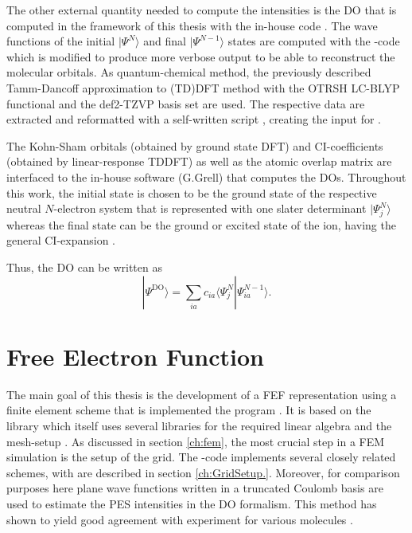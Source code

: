 The other external quantity needed to compute the intensities is the DO that is computed in the framework of this thesis with the in-house code  \cite{MAgg}.
The wave functions of the initial $|\Psi^N\rangle$ and final $|\Psi^{N-1}\rangle$ states are computed with the -code which is modified to produce more verbose output to be able to reconstruct the molecular orbitals.
As quantum-chemical method, the previously described Tamm-Dancoff approximation to (TD)DFT method with the OTRSH LC-BLYP \cite{lcBLYP} functional and the def2-TZVP \cite{def2tzvp} basis set are used.
The respective data are extracted and reformatted with a self-written script \cite{nwc2dy}, creating the input for .

The Kohn-Sham orbitals (obtained by ground state DFT) and CI-coefficients (obtained by linear-response TDDFT) as well as the atomic overlap matrix are interfaced to the in-house software  \cite{MAgg} (G.Grell) that computes the DOs.
Throughout this work, the initial state is chosen to be the ground state of the respective neutral $N$-electron system that is represented with one slater determinant $|\Psi_j^N\rangle$ whereas the final state can be the ground or excited state of the ion, having the general CI-expansion .

Thus, the DO can be written as
\begin{equation} \label{eq:doCI}
|\Psi^\text{DO}\rangle=\sum_{ia} c_{ia} \langle \Psi_j^N| \Psi_{ia}^{N-1} \rangle.
\end{equation}

\section{Free Electron Function}
\label{sec:grid}
The main goal of this thesis is the development of a FEF representation using a finite element scheme that is implemented the program  \cite{FreeWilly}.
It is based on the library  \cite{libmesh} which itself uses several libraries for the required linear algebra \cite{petsc, slepc1,eigen} and the mesh-setup \cite{tetgen,qhull}.
As discussed in section \ref{ch:fem}, the most crucial step in a FEM simulation is the setup of the grid.
The -code implements several closely related schemes, with are described in section \ref{ch:GridSetup.}.
Moreover, for comparison purposes here plane wave functions written in a truncated Coulomb basis are used to estimate the PES intensities in the DO formalism.
This method has shown to yield good agreement with experiment for various molecules \cite{ezDyson,GrellKuehn,DO_TDDFT}.

